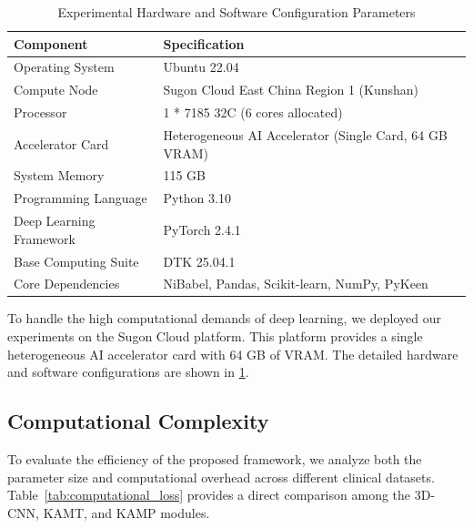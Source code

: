 \documentclass[sn-mathphys-num]{sn-jnl}%
\theoremstyle{thmstyleone}%
\theoremstyle{thmstyletwo}%
\theoremstyle{thmstylethree}%
\begin{document}
\begin{table}[!htb]
\renewcommand{\arraystretch}{1.3} %
\centering
\caption{Experimental Hardware and Software Configuration Parameters}
\label{tab:env_config}
\begin{tabular}{ll}
\hline
\textbf{Component} & \textbf{Specification} \\
\hline
Operating System        & Ubuntu 22.04 \\
Compute Node            & Sugon Cloud East China Region 1 (Kunshan) \\
Processor               & 1 * 7185 32C (6 cores allocated) \\
Accelerator Card        & Heterogeneous AI Accelerator (Single Card, 64 GB VRAM) \\
System Memory           & 115 GB \\
Programming Language    & Python 3.10 \\
Deep Learning Framework & PyTorch 2.4.1 \\
Base Computing Suite    & DTK 25.04.1 \\
Core Dependencies       & NiBabel, Pandas, Scikit-learn, NumPy, PyKeen \\
\hline
\end{tabular}
\end{table}

To handle the high computational demands of deep learning, we deployed our experiments on the Sugon Cloud platform. This platform provides a single heterogeneous AI accelerator card with 64 GB of VRAM. The detailed hardware and software configurations are shown in \cref{tab:env_config}.



\subsection{Computational Complexity}

To evaluate the efficiency of the proposed framework, we analyze both the parameter size and computational overhead across different clinical datasets. Table~\ref{tab:computational_loss} provides a direct comparison among the 3D-CNN, KAMT, and KAMP modules.
\end{document}
